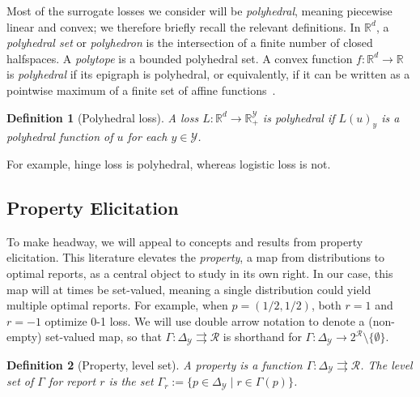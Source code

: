 \documentclass[11pt]{article}
\newcommand{\reals}{\mathbb{R}}
\newcommand{\simplex}{\Delta_\Y}
\newcommand{\R}{\mathcal{R}}
\newcommand{\Y}{\mathcal{Y}}
\newcommand{\toto}{\rightrightarrows}
\newtheorem{definition}{Definition}
\begin{document}
Most of the surrogate losses we consider will be \emph{polyhedral}, meaning piecewise linear and convex; we therefore briefly recall the relevant definitions.
In $\reals^d$, a \emph{polyhedral set} or \emph{polyhedron} is the intersection of a finite number of closed halfspaces.
A \emph{polytope} is a bounded polyhedral set.
A convex function $f:\reals^d\to\reals$ is \emph{polyhedral} if its epigraph is polyhedral, or equivalently, if it can be written as a pointwise maximum of a finite set of affine functions~\citep{rockafellar1997convex}.
%
\begin{definition}[Polyhedral loss]
  A loss $L: \reals^d \to \reals^{\Y}_+$ is \emph{polyhedral} if $L(u)_y$ is a polyhedral function of $u$ for each $y\in\Y$.
\end{definition}
%
For example, hinge loss is polyhedral, whereas logistic loss is not.

\subsection{Property Elicitation}
\label{sec:property-elicitation}

To make headway, we will appeal to concepts and results from property elicitation.
This literature elevates the \emph{property}, a map from distributions to optimal reports, as a central object to study in its own right.
In our case, this map will at times be set-valued, meaning a single distribution could yield multiple optimal reports.
For example, when $p=(1/2,1/2)$, both $r=1$ and $r=-1$ optimize 0-1 loss.
We will use double arrow notation to denote a (non-empty) set-valued map, so that $\Gamma: \simplex \toto \R$ is shorthand for $\Gamma: \simplex \to 2^{\R} \setminus \{\emptyset\}$.

\begin{definition}[Property, level set]\label{def:property}
  A \emph{property} is a function $\Gamma:\simplex\toto\R$.
  The \emph{level set} of $\Gamma$ for report $r$ is the set $\Gamma_r := \{p \in \simplex \mid r \in \Gamma(p)\}$.
\end{definition}
\end{document}
